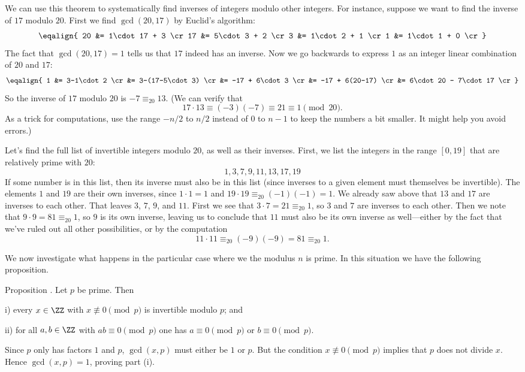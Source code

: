 We can use this theorem to systematically find inverses of integers modulo other integers. For instance,
suppose we want to find the inverse of $17$ modulo $20$. First we find $\gcd(20,17)$ by Euclid's
algorithm:
$$\eqalign{
20 &= 1\cdot 17 + 3 \cr
17 &= 5\cdot 3 + 2 \cr
3 &= 1\cdot 2 + 1 \cr
1 &= 1\cdot 1 + 0 \cr
}$$
The fact that $\gcd(20,17) = 1$ tells us that $17$ indeed has an inverse. Now we go backwards to
express $1$ as an integer linear combination of $20$ and $17$:
$$\eqalign{
1 &= 3-1\cdot 2 \cr
&= 3-(17-5\cdot 3) \cr
&= -17 + 6\cdot 3 \cr
&= -17 + 6(20-17) \cr
&= 6\cdot 20 - 7\cdot 17 \cr
}$$
So the inverse of $17$ modulo $20$ is $-7 \equiv_{20} 13$. (We can verify that
$$17\cdot 13\equiv (-3)(-7)\equiv 21 \equiv 1\pmod {20}.$$
As a trick for computations, use the range $-n/2$ to $n/2$ instead of $0$ to $n-1$ to keep the
numbers a bit smaller. It might help you avoid errors.)

Let's find the full list of invertible integers modulo $20$, as well as their inverses. First,
we list the integers in the range $[0,19]$ that are relatively prime with $20$:
$$1,3,7,9,11,13,17,19$$
If some number is in this list, then its inverse must also be in this list (since inverses to
a given element must themselves be invertible).
The elements $1$ and $19$ are their own inverses, since $1\cdot 1 = 1$ and
$19\cdot 19 \equiv_{20} (-1)(-1) = 1$.
We already saw above that $13$ and $17$ are inverses to each other. That leaves $3$, $7$, $9$, and $11$.
First we see that $3\cdot 7 = 21 \equiv_{20} 1$, so $3$ and $7$ are inverses to each other.
Then we note that $9\cdot 9 = 81 \equiv_{20} 1$, so $9$ is its own inverse, leaving us to conclude
that $11$ must also be its own inverse as well---either by the fact that we've ruled
out all other possibilities, or by the computation
$$11\cdot 11 \equiv_{20} (-9)(-9)  = 81 \equiv_{20} 1.$$

We now investigate what happens in the particular case where we the modulus $n$ is prime.
In this situation we have the following proposition.

\edef\propinvertiblemodp{\the\thmcount}
\proclaim Proposition \advthm. Let $p$ be prime. Then
\medskip
\item{i)} every $x\in \ZZ$ with $x\not\equiv 0\pmod p$ is invertible modulo $p$; and
\smallskip
\item{ii)} for all $a,b\in \ZZ$ with $ab\equiv 0\pmod p$ one has
$a\equiv 0\pmod p$ or $b\equiv 0\pmod p$.
\medskip

\proof Since $p$ only has factors $1$ and $p$, $\gcd(x,p)$ must either be $1$ or $p$.
But the condition $x\not\equiv 0\pmod p$ implies that $p$ does not divide $x$.
Hence $\gcd(x,p) = 1$, proving part (i).

